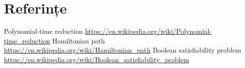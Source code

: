 \documentclass[12pt]{article}
\begin{document}
\section{Referințe}
\renewcommand{\section}[2]{}%
\begin{thebibliography}{9}
    Polynomial-time reduction\newline
    \url{https://en.wikipedia.org/wiki/Polynomial-time_reduction}
    Hamiltonian path\newline
    \url{https://en.wikipedia.org/wiki/Hamiltonian_path}
    Boolean satisfiability problem\newline
    \url{https://en.wikipedia.org/wiki/Boolean_satisfiability_problem}
\end{thebibliography}
\end{document}
